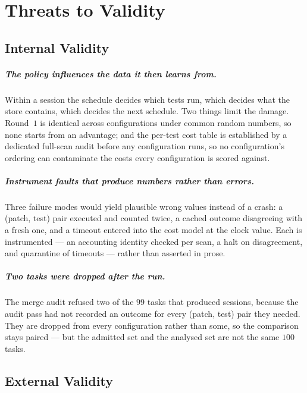 \chapter{Threats to Validity}
\label{ch:threats}

\section{Internal Validity}

\paragraph{The policy influences the data it then learns from.} Within a
session the schedule decides which tests run, which decides what the store
contains, which decides the next schedule. Two things limit the damage.
Round~$1$ is identical across configurations under common random numbers, so
none starts from an advantage; and the per-test cost table is established by a
dedicated full-scan audit before any configuration runs, so no configuration's
ordering can contaminate the costs every configuration is scored against.

\paragraph{Instrument faults that produce numbers rather than errors.} Three
failure modes would yield plausible wrong values instead of a crash: a
(patch, test) pair executed and counted twice, a cached outcome disagreeing
with a fresh one, and a timeout entered into the cost model at the clock value.
Each is instrumented --- an accounting identity checked per scan, a halt on
disagreement, and quarantine of timeouts --- rather than asserted in prose.

\paragraph{Two tasks were dropped after the run.} The merge audit refused two
of the $99$ tasks that produced sessions, because the audit pass had not
recorded an outcome for every (patch, test) pair they needed. They are dropped
from every configuration rather than some, so the comparison stays paired ---
but the admitted set and the analysed set are not the same $100$ tasks.

\section{External Validity}

